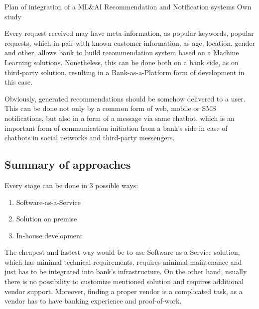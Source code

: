 \mttable
{Plan of integration of a ML\&AI Recommendation and Notification systems}
{Own study}
{
}

Every request received may have meta-information, as popular keywords, popular requests, which in pair with known customer information, as age, location, gender and other, allows bank to build recommendation system based on a Machine Learning solutions.
Nonetheless, this can be done both on a bank side, as on third-party solution, resulting in a Bank-as-a-Platform form of development in this case.

Obviously, generated recommendations should be somehow delivered to a user.
This can be done not only by a common form of web, mobile or SMS notifications, but also in a form of a message via same chatbot, which is an important form of communication initiation from a bank's side in case of chatbots in social networks and third-party messengers.

\subsection{Summary of approaches}

Every stage can be done in 3 possible ways:
\begin{enumerate}
    \item Software-as-a-Service
    \item Solution on premise
    \item In-house development
\end{enumerate}

The cheapest and fastest way would be to use Software-as-a-Service solution, which has minimal technical requirements, requires minimal maintenance and just has to be integrated into bank's infrastructure. 
On the other hand, usually there is no possibility to customize mentioned solution and requires additional vendor support. 
Moreover, finding a proper vendor is a complicated task, as a vendor has to have banking experience and proof-of-work.

